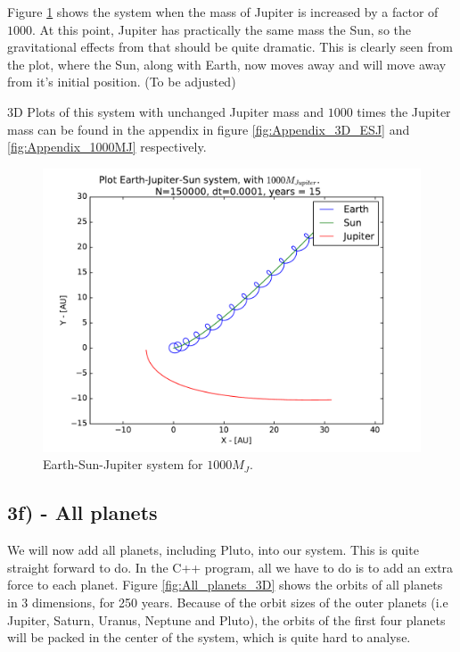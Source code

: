 \documentclass[12pt]{article}
\begin{document}
Figure \ref{fig:ESJ_1000MJ} shows the system when the mass of Jupiter is increased by a factor of $1000$. At this point, Jupiter has practically the same mass the Sun, so the gravitational effects from that should be quite dramatic. This is clearly seen from the plot, where the Sun, along with Earth, now moves away and will move away from it's initial position. (To be adjusted)

3D Plots of this system with unchanged Jupiter mass and $1000$ times the Jupiter mass can be found in the appendix in figure \ref{fig:Appendix_3D_ESJ} and \ref{fig:Appendix_1000MJ} respectively.

\begin{figure}[!h]
\centering
\includegraphics[width=\linewidth]{Plots/Earth_Sun_Jupiter_1000MJ.pdf}
\caption{Earth-Sun-Jupiter system for $1000M_J$.}
\label{fig:ESJ_1000MJ}
\end{figure}

\FloatBarrier

\subsection*{3f) - All planets}
We will now add all planets, including Pluto, into our system. This is quite straight forward to do. In the C++ program, all we have to do is to add an extra force to each planet. Figure \ref{fig:All_planets_3D} shows the orbits of all planets in 3 dimensions, for 250 years. Because of the orbit sizes of the outer planets (i.e Jupiter, Saturn, Uranus, Neptune and Pluto), the orbits of the first four planets will be packed in the center of the system, which is quite hard to analyse. 
\end{document}
